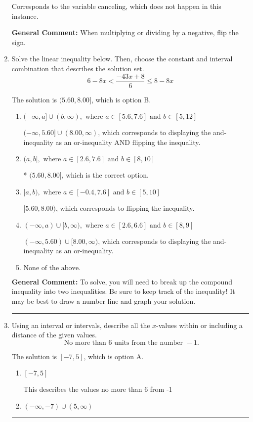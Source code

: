 \documentclass{extbook}[14pt]
\newcommand{\litem}[1]{\item #1

\rule{\textwidth}{0.4pt}}
\begin{document}
\begin{enumerate}
{\begin{enumerate}[label=\Alph*.]
Corresponds to the variable canceling, which does not happen in this instance.
\end{enumerate}

\textbf{General Comment:} When multiplying or dividing by a negative, flip the sign.
}
\litem{
Solve the linear inequality below. Then, choose the constant and interval combination that describes the solution set.
\[ 6 - 8 x < \frac{-43 x + 8}{6} \leq 8 - 8 x \]

The solution is \( (5.60, 8.00] \), which is option B.\begin{enumerate}[label=\Alph*.]
\item \( (-\infty, a] \cup (b, \infty), \text{ where } a \in [5.6, 7.6] \text{ and } b \in [5, 12] \)

$(-\infty, 5.60] \cup (8.00, \infty)$, which corresponds to displaying the and-inequality as an or-inequality AND flipping the inequality.
\item \( (a, b], \text{ where } a \in [2.6, 7.6] \text{ and } b \in [8, 10] \)

* $(5.60, 8.00]$, which is the correct option.
\item \( [a, b), \text{ where } a \in [-0.4, 7.6] \text{ and } b \in [5, 10] \)

$[5.60, 8.00)$, which corresponds to flipping the inequality.
\item \( (-\infty, a) \cup [b, \infty), \text{ where } a \in [2.6, 6.6] \text{ and } b \in [8, 9] \)

$(-\infty, 5.60) \cup [8.00, \infty)$, which corresponds to displaying the and-inequality as an or-inequality.
\item \( \text{None of the above.} \)


\end{enumerate}

\textbf{General Comment:} To solve, you will need to break up the compound inequality into two inequalities. Be sure to keep track of the inequality! It may be best to draw a number line and graph your solution.
}
\litem{
Using an interval or intervals, describe all the $x$-values within or including a distance of the given values.
\[ \text{ No more than } 6 \text{ units from the number } -1. \]

The solution is \( [-7, 5] \), which is option A.\begin{enumerate}[label=\Alph*.]
\item \( [-7, 5] \)

This describes the values no more than 6 from -1
\item \( (-\infty, -7) \cup (5, \infty) \)


\end{enumerate}}
\end{enumerate}
\end{document}
